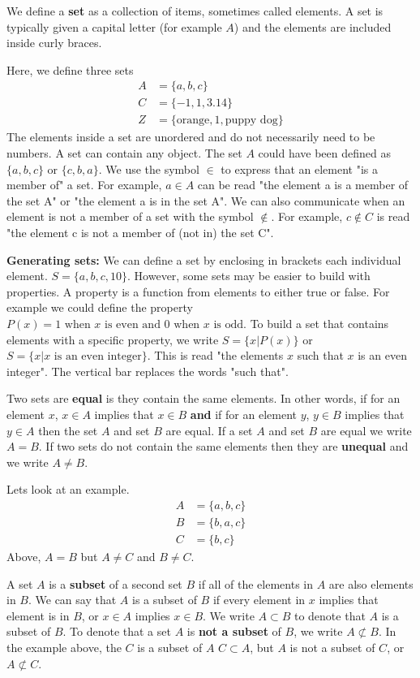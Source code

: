We define a \textbf{set} as a collection of items, sometimes called elements. 
A set is typically given a capital letter (for example $A$) and the elements are included inside curly braces. 

Here, we define three sets
\begin{align}
    A &= \{ a,b,c\}\\
    C &= \{ -1,1,3.14\}\\
    Z &= \{ \text{orange},1,\text{puppy dog}\}
\end{align}
The elements inside a set are unordered and do not necessarily need to be numbers. A set can contain any object.
The set $A$ could have been defined as $\{a,b,c\}$ or $\{c,b,a\}$.
We use the symbol $\in$ to express that an element "is a member of" a set.
For example, $a \in A$ can be read "the element a is a member of the set A" or "the element a is in the set A". 
We can also communicate when an element is not a member of a set with the symbol $\notin$.
For example, $c \notin C$ is read "the element c is not a member of (not in) the set C".

\textbf{Generating sets:} We can define a set by enclosing in brackets each individual element. $S = \{a,b,c,10\}$.
However, some sets may be easier to build with properties.
A property is a function from elements to either true or false. 
For example we could define the property $P(x) = 1 \text{ when } x \text{ is even and } 0 \text{ when } x \text{ is odd}$. 
To build a set that contains elements with a specific property, we write
$S = \{x | P(x)\}$ or $S = \{x | x \text{ is an even integer} \}$. 
This is read "the elements $x$ such that $x$ is an even integer".
The vertical bar replaces the words "such that".

Two sets are \textbf{equal} is they contain the same elements.
In other words, if for an element $x$, $x \in A$ implies that $x \in B$ \textbf{and} if for an element $y$, $y \in B$ implies that $y \in A$ then the set $A$ and set $B$ are equal.
If a set $A$ and set $B$ are equal we write $A=B$. 
If two sets do not contain the same elements then they are \textbf{unequal} and we write $A \neq B$.

Lets look at an example.
\begin{align}
    A &= \{ a,b,c\}\\
    B &= \{ b,a,c\}\\
    C &= \{ b,c\}
\end{align}
Above, $A=B$ but $A \neq C$ and $B \neq C$.

A set $A$ is a \textbf{subset} of a second set $B$ if all of the elements in $A$ are also elements in $B$.
We can say that $A$ is a subset of $B$ if every element in $x$ implies that element is in $B$, or $x \in A$ implies $x \in B$.
We write $A \subset B$ to denote that $A$ is a subset of $B$. 
To denote that a set $A$ is \textbf{not a subset} of $B$, we write $A \not\subset B$. 
In the example above, the $C$ is a subset of $A$ $C \subset A$, but $A$ is not a subset of $C$, or $A \not\subset C$.

